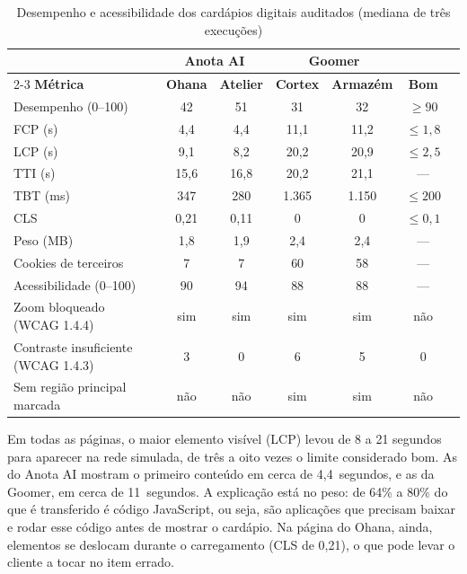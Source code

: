 \begin{table}[!ht]
    \caption{Desempenho e acessibilidade dos cardápios digitais auditados (mediana de três execuções)}
    \label{tab:lighthouse}
    \centering%
    \begin{minipage}{.98\textwidth}
        \small
        \renewcommand{\arraystretch}{1.2}
        \begin{tabular*}{\textwidth}{l@{\extracolsep{\fill}}cccccc}
            \toprule
            & \multicolumn{2}{c}{\textbf{Anota AI}} & \multicolumn{2}{c}{\textbf{Goomer}} & \\
            \cmidrule{2-3}\cmidrule{4-5}
            \textbf{Métrica} & \textbf{Ohana} & \textbf{Atelier} & \textbf{Cortex} & \textbf{Armazém} & \textbf{Bom} \\
            \midrule
            Desempenho (0--100) & 42 & 51 & 31 & 32 & $\geq 90$ \\
            FCP (s) & 4,4 & 4,4 & 11,1 & 11,2 & $\leq 1{,}8$ \\
            LCP (s) & 9,1 & 8,2 & 20,2 & 20,9 & $\leq 2{,}5$ \\
            TTI (s) & 15,6 & 16,8 & 20,2 & 21,1 & --- \\
            TBT (ms) & 347 & 280 & 1.365 & 1.150 & $\leq 200$ \\
            CLS & 0,21 & 0,11 & 0 & 0 & $\leq 0{,}1$ \\
            Peso (MB) & 1,8 & 1,9 & 2,4 & 2,4 & --- \\
            Cookies de terceiros & 7 & 7 & 60 & 58 & --- \\
            \midrule
            Acessibilidade (0--100) & 90 & 94 & 88 & 88 & --- \\
            Zoom bloqueado (WCAG 1.4.4) & sim & sim & sim & sim & não \\
            Contraste insuficiente (WCAG 1.4.3) & 3 & 0 & 6 & 5 & 0 \\
            Sem região principal marcada & não & não & sim & sim & não \\
            \bottomrule
        \end{tabular*}
    \end{minipage}
\end{table}

Em todas as páginas, o maior elemento visível (LCP) levou de 8 a 21 segundos para aparecer na rede simulada, de três a oito vezes o limite considerado bom. As do Anota AI mostram o primeiro conteúdo em cerca de 4,4~segundos, e as da Goomer, em cerca de 11~segundos. A explicação está no peso: de 64\% a 80\% do que é transferido é código JavaScript, ou seja, são aplicações que precisam baixar e rodar esse código antes de mostrar o cardápio. Na página do Ohana, ainda, elementos se deslocam durante o carregamento (CLS de 0,21), o que pode levar o cliente a tocar no item errado.

